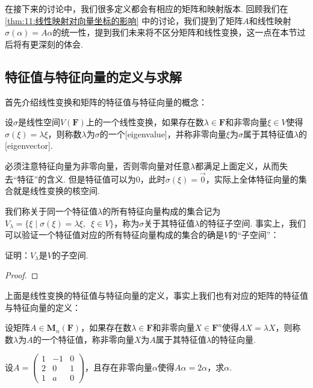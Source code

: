在接下来的讨论中，我们很多定义都会有相应的矩阵和映射版本. 回顾我们在\autoref{thm:11:线性映射对向量坐标的影响} 中的讨论，我们提到了矩阵$A$和线性映射$\sigma(\alpha)=A\alpha$的统一性，提到我们未来将不区分矩阵和线性变换，这一点在本节过后将有更深刻的体会.

\subsection{特征值与特征向量的定义与求解}

首先介绍线性变换和矩阵的特征值与特征向量的概念：
\begin{definition}
    设$\sigma$是线性空间$V(\mathbf{F})$上的一个线性变换，如果存在数$\lambda\in\mathbf{F}$和非零向量$\xi\in V$使得$\sigma(\xi)=\lambda\xi$，则称数$\lambda$为$\sigma$的一个[eigenvalue]，并称非零向量$\xi$为$\sigma$属于其特征值$\lambda$的[eigenvector].
\end{definition}
必须注意特征向量为非零向量，否则零向量对任意$\lambda$都满足上面定义，从而失去``特征''的含义. 但是特征值可以为0，此时$\sigma(\xi)=\vec{0}$，实际上全体特征向量的集合就是线性变换的核空间.

我们称关于同一个特征值$\lambda$的所有特征向量构成的集合记为$V_\lambda=\{\xi \mid \sigma(\xi)=\lambda\xi,\enspace\xi\in V\}$，称为$\sigma$关于其特征值$\lambda$的特征子空间. 事实上，我们可以验证一个特征值对应的所有特征向量构成的集合的确是$V$的``子空间''：
\begin{example}
    证明：$V_\lambda$是$V$的子空间.
\end{example}

\begin{proof}

\end{proof}

上面是线性变换的特征值与特征向量的定义，事实上我们也有对应的矩阵的特征值与特征向量的定义：
\begin{definition}
    设矩阵$A\in \mathbf{M}_n(\mathbf{F})$，如果存在数$\lambda\in\mathbf{F}$和非零向量$X\in\mathbf{F}^n$使得$AX=\lambda X$，则称数$\lambda$为$A$的一个特征值，称非零向量$X$为$A$属于其特征值$\lambda$的特征向量.
\end{definition}

\begin{example}
    设$A=\begin{pmatrix}
            1 & -1 & 0 \\ 2 & 0 & 1 \\ 1 & a & 0
        \end{pmatrix}$，且存在非零向量$\alpha$使得$A\alpha=2\alpha$，求$\alpha$.
\end{example}


